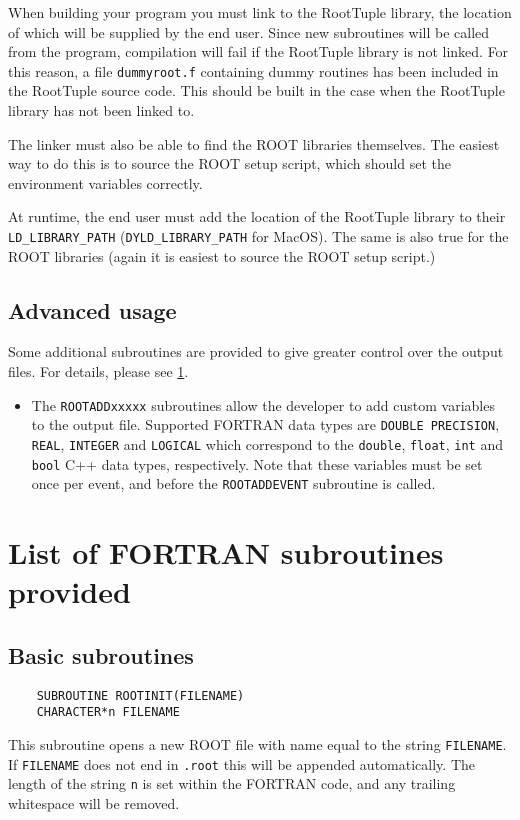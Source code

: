 \documentclass[a4paper,12pt]{article}
\begin{document}
When building your program you must link to the RootTuple library, the location of which will be supplied by the end user. Since new subroutines will be called from the program, compilation will fail if the RootTuple library is not linked. For this reason, a file \verb|dummyroot.f| containing dummy routines has been included in the RootTuple source code. This should be built in the case when the RootTuple library has not been linked to.

The linker must also be able to find the ROOT libraries themselves. The easiest way to do this is to source the ROOT setup script, which should set the environment variables correctly.

At runtime, the end user must add the location of the RootTuple library to their \verb|LD_LIBRARY_PATH| (\verb|DYLD_LIBRARY_PATH| for MacOS). The same is also true for the ROOT libraries (again it is easiest to source the ROOT setup script.)

\subsection{Advanced usage}
Some additional subroutines are provided to give greater control over the output files. For details, please see \textsection\ref{sec:routines}.
\begin{itemize}
    \item The \verb|ROOTADDxxxxx| subroutines allow the developer to add custom variables to the output file. Supported FORTRAN data types are \verb|DOUBLE PRECISION|, \verb|REAL|, \verb|INTEGER| and \verb|LOGICAL| which correspond to the \verb|double|, \verb|float|, \verb|int| and \verb|bool| C++ data types, respectively. Note that these variables must be set once per event, and before the \verb|ROOTADDEVENT| subroutine is called.
\end{itemize}

\section{List of FORTRAN subroutines provided}
\label{sec:routines}
\subsection{Basic subroutines}
\begin{verbatim}
    SUBROUTINE ROOTINIT(FILENAME)
    CHARACTER*n FILENAME\end{verbatim}
This subroutine opens a new ROOT file with name equal to the string \verb|FILENAME|. If \verb|FILENAME| does not end in \verb|.root| this will be appended automatically. The length of the string \verb|n| is set within the FORTRAN code, and any trailing whitespace will be removed.
\end{document}
